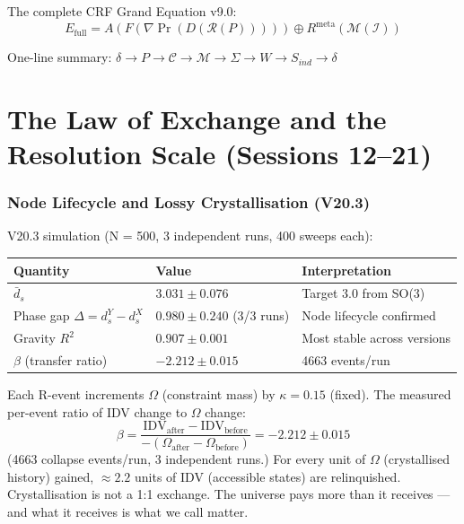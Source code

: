 \documentclass[12pt, a4paper]{article}
\begin{document}
The complete CRF Grand Equation v9.0:
\[
  E_{\mathrm{full}} = A(F(\nabla\Pr(D(\mathcal{R}(P)))))
  \oplus R^{\mathrm{meta}}(\mathcal{M}(\mathcal{I}))
\]

One-line summary: $\delta \to P \to \mathcal{C} \to \mathcal{M} \to \Sigma \to W \to S_{ind} \to \delta$

\part{The Law of Exchange and the Resolution Scale (Sessions 12--21)}

\section{Node Lifecycle and Lossy Crystallisation (V20.3)}

V20.3 simulation (N = 500, 3 independent runs, 400 sweeps each):

\begin{center}
\renewcommand{\arraystretch}{1.2}
\begin{tabular}{lll}
\toprule
\textbf{Quantity} & \textbf{Value} & \textbf{Interpretation} \\
\midrule
$\bar{d}_s$ & $3.031 \pm 0.076$ & Target 3.0 from SO(3) \\
Phase gap $\Delta = d_s^Y - d_s^X$ & $0.980 \pm 0.240$ (3/3 runs) & Node lifecycle confirmed \\
Gravity $R^2$ & $0.907 \pm 0.001$ & Most stable across versions \\
$\beta$ (transfer ratio) & $-2.212 \pm 0.015$ & 4663 events/run \\
\bottomrule
\end{tabular}
\end{center}

\begin{derivedbox}[title={Lossy Crystallisation: Transfer Ratio $\beta$ (Confirmed)}]
Each R-event increments $\Omega$ (constraint mass) by $\kappa = 0.15$ (fixed). The
measured per-event ratio of IDV change to $\Omega$ change:
\[
  \beta = \frac{\mathrm{IDV}_{\mathrm{after}} - \mathrm{IDV}_{\mathrm{before}}}
               {-(\Omega_{\mathrm{after}} - \Omega_{\mathrm{before}})} = -2.212 \pm 0.015
\]
(4663 collapse events/run, 3 independent runs.) For every unit of $\Omega$ (crystallised
history) gained, $\approx 2.2$ units of IDV (accessible states) are relinquished.
Crystallisation is not a 1:1 exchange. The universe pays more than it receives ---
and what it receives is what we call matter.
\end{derivedbox}
\end{document}
